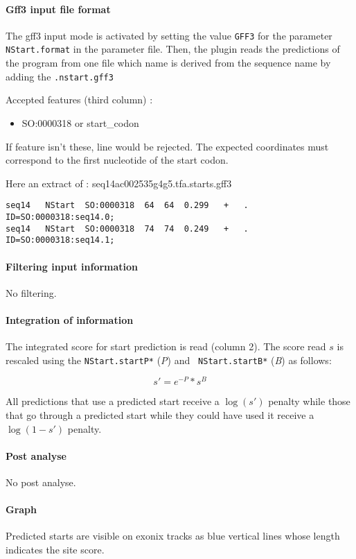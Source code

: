 \paragraph{Gff3 input file format}
The gff3 input mode is activated by setting the value \texttt{GFF3} for the parameter
\texttt{NStart.format} in the parameter file.
Then, the plugin reads the predictions of the program from one file which
name is derived from the sequence name by adding the \texttt{.nstart.gff3}

Accepted features (third column) :
\begin{itemize}
\item  SO:0000318 or start\_codon
\end{itemize}
If feature isn't these, line would be rejected. The expected coordinates must correspond to the first nucleotide of the start codon.

Here an extract of : seq14ac002535g4g5.tfa.starts.gff3
\begin{Verbatim}[fontsize=\tiny]
seq14	NStart	SO:0000318	64	64	0.299	+	.	ID=SO:0000318:seq14.0;
seq14	NStart	SO:0000318	74	74	0.249	+	.	ID=SO:0000318:seq14.1;
\end{Verbatim}


\paragraph{Filtering input information}

No filtering.

\paragraph{Integration of information}

The integrated score for start prediction is read (column 2).  The
score read $s$ is rescaled using the {\tt NStart.startP*} (\emph{P}) and {\tt
NStart.startB*} (\emph{B}) as follows:

\[s' = e^{-P}*s^B\]

All predictions that use a predicted start receive a $\log(s')$
penalty while those that go through a predicted start while they
could have used it receive a $\log(1-s')$ penalty.


\paragraph{Post analyse}

No post analyse.

\paragraph{Graph}

Predicted starts are visible on exonix tracks as blue vertical lines
whose length indicates the site score.






